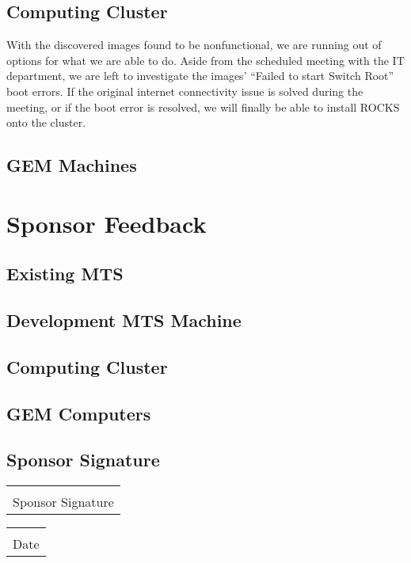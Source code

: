 \documentclass[12pt]{article}
\makeatletter
\newcommand\tab[1][1cm]{\hspace*{#1}}
\newcommand{\titledate}[2][2.5in]{%
	\noindent%
	\begin{tabular}{@{}p{#1}@{}}
		\\ \hline \\[-.75\normalbaselineskip]
		#2
	\end{tabular} \hspace{1in}
	\begin{tabular}{@{}p{#1}@{}}
		\\ \hline \\[-.75\normalbaselineskip]
		Date
	\end{tabular}
}
\makeatother
\begin{document}
\subsection{Computing Cluster}

\tab With the discovered images found to be nonfunctional, we are running out of
options for what we are able to do. Aside from the scheduled meeting with the IT
department, we are left to investigate the images' ``Failed to start Switch
Root'' boot errors. If the original internet connectivity issue is solved during
the meeting, or if the boot error is resolved, we will finally be able to
install ROCKS onto the cluster.

\subsection{GEM Machines}


\section{Sponsor Feedback}

\subsection{Existing MTS}

\vspace{1in}

\subsection{Development MTS Machine}

\vspace{1in}

\subsection{Computing Cluster}

\vspace{1in}

\subsection{GEM Computers}

\vspace{1in}


\subsection{Sponsor Signature}
\vspace{.5in}
 \titledate{Sponsor Signature}
 
\end{document}
